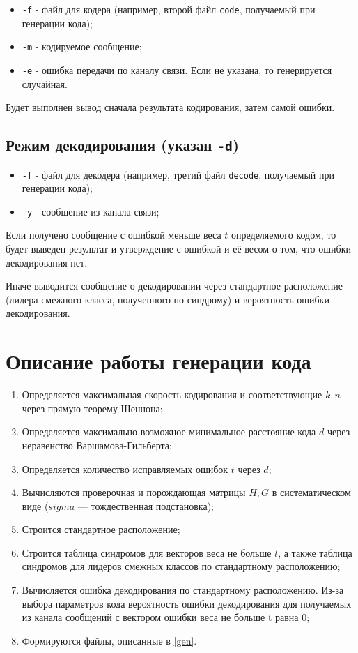 \documentclass{article}
\begin{document}
\begin{itemize}
\item \texttt{-f} - файл для кодера (например, второй файл \texttt{code}, получаемый при генерации кода);
\item \texttt{-m} - кодируемое сообщение;
\item \texttt{-e} - ошибка передачи по каналу связи.
Если не указана, то генерируется случайная.
\end{itemize}

Будет выполнен вывод сначала результата кодирования, затем самой ошибки.

\subsection{Режим декодирования (указан \texttt{-d})}

\begin{itemize}
\item \texttt{-f} - файл для декодера (например, третий файл \texttt{decode}, получаемый при генерации кода);
\item \texttt{-y} - сообщение из канала связи;
\end{itemize}

Если получено сообщение с ошибкой меньше веса $t$ определяемого кодом, то будет выведен результат и утверждение с ошибкой и её весом о том, что ошибки декодирования нет.

Иначе выводится сообщение о декодировании через стандартное расположение (лидера смежного класса, полученного по синдрому) и вероятность ошибки декодирования.

\section{Описание работы генерации кода}

\begin{enumerate}
\item Определяется максимальная скорость кодирования и соответствующие $k, n$ через прямую теорему Шеннона;
\item Определяется максимально возможное минимальное расстояние кода $d$ через неравенство Варшамова-Гильберта;
\item Определяется количество исправляемых ошибок $t$ через $d$;
\item Вычисляются проверочная и порождающая матрицы $H, G$ в систематическом виде ($sigma$ --- тождественная подстановка);
\item Строится стандартное расположение;
\item Строится таблица синдромов для векторов веса не больше $t$, а также таблица синдромов для лидеров смежных классов по стандартному расположению;
\item Вычисляется ошибка декодирования по стандартному расположению.
Из-за выбора параметров кода вероятность ошибки декодирования для получаемых из канала сообщений с вектором ошибки веса не больше t равна 0;
\item Формируются файлы, описанные в \ref{gen}.
\end{enumerate}
\end{document}
